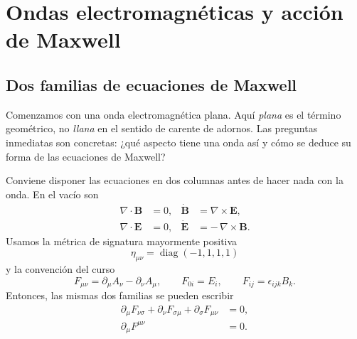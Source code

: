 \chapter{Ondas electromagnéticas y acción de Maxwell}


\section{Dos familias de ecuaciones de Maxwell}

Comenzamos con una onda electromagnética plana. Aquí \emph{plana} es el término geométrico, no \emph{llana} en el sentido de carente de adornos. Las preguntas inmediatas son concretas: ¿qué aspecto tiene una onda así y cómo se deduce su forma de las ecuaciones de Maxwell?

Conviene disponer las ecuaciones en dos columnas antes de hacer nada con la onda. En el vacío son
\begin{align}
\nabla\cdot\mathbf B&=0,
&
\dot{\mathbf B}&=\nabla\times\mathbf E,
\label{eq:homogeneous-vector}
\\
\nabla\cdot\mathbf E&=0,
&
\dot{\mathbf E}&=-\,\nabla\times\mathbf B.
\label{eq:dynamical-vector-vacuum}
\end{align}
Usamos la métrica de signatura mayormente positiva
\begin{equation}
\eta_{\mu\nu}=\operatorname{diag}(-1,1,1,1)
\end{equation}
y la convención del curso
\begin{equation}
F_{\mu\nu}
=
\partial_\mu A_\nu-\partial_\nu A_\mu,
\qquad
F_{0i}=E_i,
\qquad
F_{ij}=\epsilon_{ijk}B_k.
\label{eq:course-f-convention}
\end{equation}
Entonces, las mismas dos familias se pueden escribir
\begin{align}
\partial_\mu F_{\nu\sigma}
+\partial_\nu F_{\sigma\mu}
+\partial_\sigma F_{\mu\nu}
&=0,
\label{eq:bianchi-l9}
\\
\partial_\mu F^{\mu\nu}
&=0.
\label{eq:vacuum-maxwell-covariant}
\end{align}

